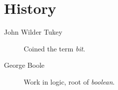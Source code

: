 \chapter{History}

\begin{description}
  \item[John Wilder Tukey] Coined the term \textit{bit}.
  \item[George Boole] Work in logic, root of \textit{boolean}.
\end{description}

